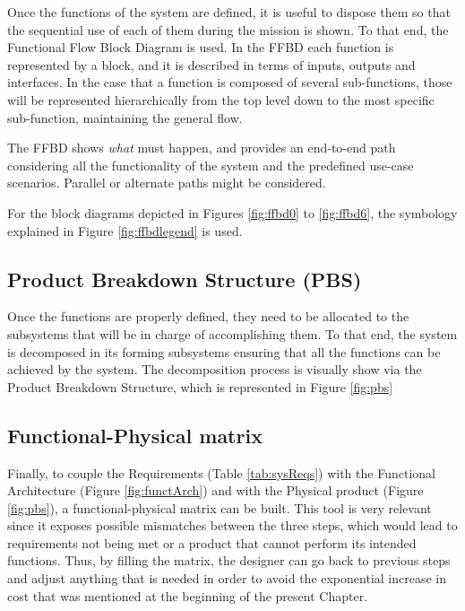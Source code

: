 Once the functions of the system are defined, it is useful to dispose them so that the sequential use of each of them during the mission is shown.
To that end, the Functional Flow Block Diagram is used.
In the FFBD each function is represented by a block, and it is described in terms of inputs, outputs and interfaces.
In the case that a function is composed of several sub-functions, those will be represented hierarchically from the top level down to the most specific sub-function, maintaining the general flow.

The FFBD shows \emph{what} must happen, and provides an end-to-end path considering all the functionality of the system and the predefined use-case scenarios.
Parallel or alternate paths might be considered.

For the block diagrams depicted in Figures \ref{fig:ffbd0} to \ref{fig:ffbd6}, the symbology explained in Figure \ref{fig:ffbdlegend} is used.






\subsection{Product Breakdown Structure (PBS)}

Once the functions are properly defined, they need to be allocated to the subsystems that will be in charge of accomplishing them.
To that end, the system is decomposed in its forming subsystems ensuring that all the functions can be achieved by the system.
The decomposition process is visually show via the Product Breakdown Structure, which is represented in Figure \ref{fig:pbs}




\subsection{Functional-Physical matrix}

Finally, to couple the Requirements (Table \ref{tab:sysReqs}) with the Functional Architecture (Figure \ref{fig:functArch}) and with the Physical product (Figure \ref{fig:pbs}), a functional-physical matrix can be built.
This tool is very relevant since it exposes possible mismatches between the three steps, which would lead to requirements not being met or a product that cannot perform its intended functions.
Thus, by filling the matrix, the designer can go back to previous steps and adjust anything that is needed in order to avoid the exponential increase in cost that was mentioned at the beginning of the present Chapter.

